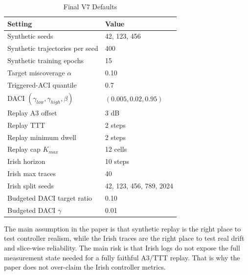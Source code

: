 \documentclass[conference]{IEEEtran}
\begin{document}
\begin{table}[t]
\caption{Final V7 Defaults}
\label{tab:v7-defaults}
\centering
\scriptsize
\begin{tabular}{ll}
\toprule
Setting & Value \\
\midrule
Synthetic seeds & 42, 123, 456 \\
Synthetic trajectories per seed & 400 \\
Synthetic training epochs & 15 \\
Target miscoverage $\alpha$ & 0.10 \\
Triggered-ACI quantile & 0.7 \\
DACI $(\gamma_{low}, \gamma_{high}, \beta)$ & $(0.005, 0.02, 0.95)$ \\
Replay A3 offset & 3 dB \\
Replay TTT & 2 steps \\
Replay minimum dwell & 2 steps \\
Replay cap $K_{max}$ & 12 cells \\
Irish horizon & 10 steps \\
Irish max traces & 40 \\
Irish split seeds & 42, 123, 456, 789, 2024 \\
Budgeted DACI target ratio & 0.10 \\
Budgeted DACI $\gamma$ & 0.01 \\
\bottomrule
\end{tabular}
\end{table}

The main assumption in the paper is that synthetic replay is the right place to test controller realism, while the Irish traces are the right place to test real drift and slice-wise reliability. The main risk is that Irish logs do not expose the full measurement state needed for a fully faithful A3/TTT replay. That is why the paper does not over-claim the Irish controller metrics.
\end{document}
